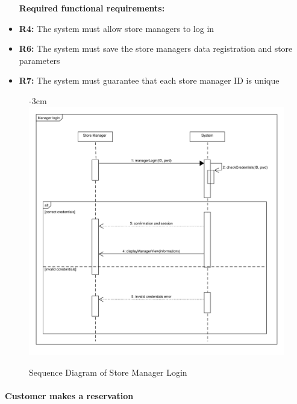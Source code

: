 \documentclass{article}
\begin{document}
\begin{center}
\begin{itemize}
					\bigskip
					\bigskip
					\bigskip
					 {\bfseries Required functional requirements: }
					\item {\bfseries R4: } The system must allow store managers to log in
					\item {\bfseries R6: } The system must save the store managers data registration and store parameters
					\item {\bfseries R7: } The system must guarantee that each store manager ID is unique

					\end{itemize}

							\begin{figure}
								\begin{adjustwidth} {-3cm}{}
									\centering
									\includegraphics[scale=0.7]{SD/4_managerLogin.pdf}\\
									\caption{Sequence Diagram of Store Manager Login}
								\end{adjustwidth}
							\end{figure}
					
				\end{center}
			
			\paragraph{Customer makes a reservation}
			
\end{document}
